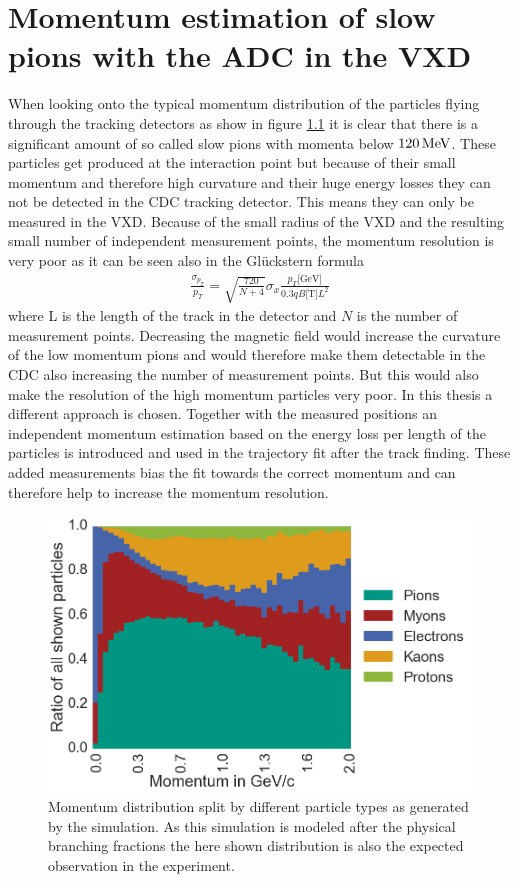 \newcommand{\dedx}{$\mathrm d E / \mathrm d x$ }
\chapter{Momentum estimation of slow pions with the ADC in the VXD}


When looking onto the typical momentum distribution of the particles flying through the tracking detectors as show in figure \ref{fig-particles-momentum} it is clear that there is a significant amount of so called slow pions with momenta below $\unit[120]{MeV}$. These particles get produced at the interaction point but because of their small momentum and therefore high curvature and their huge energy losses they can not be detected in the CDC tracking detector. This means they can only be measured in the VXD. Because of the small radius of the VXD and the resulting small number of independent measurement points, the momentum resolution is very poor as it can be seen also in the Glückstern formula
\begin{align*}
 \frac{\sigma_{p_T}}{p_T} = \sqrt{\frac{720}{N + 4}} \sigma_x \frac{p_T \text{[GeV]}}{0.3 q B \text{[T]} L^2}
\end{align*}
where L is the length of the track in the detector and $N$ is the number of measurement points. Decreasing the magnetic field would increase the curvature of the low momentum pions and would therefore make them detectable in the CDC also increasing the number of measurement points. But this would also make the resolution of the high momentum particles very poor. In this thesis a different approach is chosen. Together with the measured positions an independent momentum estimation based on the energy loss per length of the particles is introduced and used in the trajectory fit after the track finding. These added measurements bias the fit towards the correct momentum and can therefore help to increase the momentum resolution.

\begin{figure}
 \centering
 \includegraphics[width=0.8\linewidth]{figures/vxd/momentumDistribution.png}
 \caption{Momentum distribution split by different particle types as generated by the simulation. As this simulation is modeled after the physical branching fractions the here shown distribution is also the expected observation in the experiment.}
 \label{fig-particles-momentum}
\end{figure}

